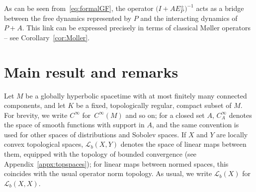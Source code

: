 \documentclass[pdftex]{sigma}
\numberwithin{equation}{section}
\newcommand{\LL}{{\mathcal L}}
\begin{document}
 As can be seen from~\eqref{eq:formalGF}, the operator $\big(I+AE_P^\pm\big)^{-1}$ acts as a bridge between the free dynamics represented by $P$ and the interacting dynamics of $P+A$. This link can be expressed precisely in terms of classical M{\o}ller operators -- see Corollary~\ref{cor:Moller}.

 \section{Main result and remarks}\label{sec:main}

 Let $M$ be a globally hyperbolic spacetime with at most finitely many connected components,
 and let $K$ be a fixed, topologically regular, compact subset of $M$. For brevity, we write $C^\infty$ for~$C^\infty(M)$ and so on; for a closed set $A$, $C^\infty_A$ denotes the space of smooth functions with support in $A$, and the same convention is used for other spaces of distributions and Sobolev spaces. If $X$ and $Y$ are locally convex topological spaces, $\LL_b(X,Y)$ denotes the space of linear maps between them, equipped with the topology of bounded convergence (see Appendix~\ref{appx:topspaces}); for linear maps between normed spaces, this coincides with the usual operator norm topology. As usual, we write $\LL_b(X)$ for $\LL_b(X,X)$.
\end{document}
